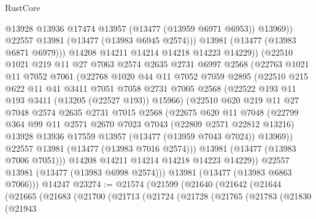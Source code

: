 \begin{lexlean}{RustCore}
\begin{coremodule}
                  @13928
                  @13936
                  @17474
                  @13957
                  (@13477 (@13959 @6971 @6953))
                  @13969))
              @22557
              @13981
              (@13477 (@13983 @6945 @2574)))
            @13981
            (@13477 (@13983 @6871 @6979)))
          @14208
          @14211
          @14214
          @14218
          @14223
          @14229))
      (@22510
        @1021
        @219
        @11
        @27
        @7063
        @2574
        @2635
        @2731
        @6997
        @2568
        (@22763
          @1021
          @11
          @7052
          @7061
          (@22768
            @1020
            @44
            @11
            @7052
            @7059
            @2895
            (@22510
              @215
              @622
              @11
              @41
              @3411
              @7051
              @7058
              @2731
              @7005
              @2568
              (@22522 @193 @11 @193 @3411 (@13205 (@22527 @193)) @15966)
              (@22510
                @620
                @219
                @11
                @27
                @7048
                @2574
                @2635
                @2731
                @7015
                @2568
                (@22675
                  @620
                  @11
                  @7048
                  (@22799
                    @364
                    @99
                    @11
                    @2571
                    @2670
                    @7023
                    @7043
                    (@22809 @2571 @22812 @13216)
                    @13928
                    @13936
                    @17559
                    @13957
                    (@13477 (@13959 @7043 @7024))
                    @13969))
                @22557
                @13981
                (@13477 (@13983 @7016 @2574)))
              @13981
              (@13477 (@13983 @7006 @7051)))
            @14208
            @14211
            @14214
            @14218
            @14223
            @14229))
        @22557
        @13981
        (@13477 (@13983 @6998 @2574)))
      @13981
      (@13477 (@13983 @6863 @7066)))
    @14247
@23274 := @21574
    (@21599
      (@21640
        (@21642
          (@21644
            (@21665
              (@21683
                (@21700
                  (@21713
                    (@21724
                      (@21728
                        (@21765
                          (@21783
                            (@21830
                              (@21943

\end{coremodule}
\end{lexlean}
